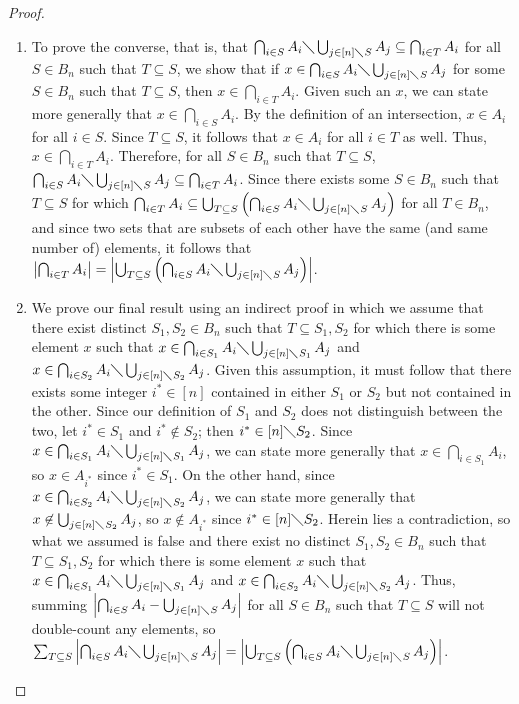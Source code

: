 \documentclass{article} %
\theoremstyle{definition}
\theoremstyle{plain}
\begin{document}
\begin{proof}
\begin{enumerate}
\item{To prove the converse, that is, that $\bigcap_{i\in S}A_i\diagdown\bigcup_{j\in [n]\diagdown S}A_j\subseteq \bigcap_{i\in T}A_i$ for all $S\in B_n$ such that $T\subseteq S$, we show that if $x\in \bigcap_{i\in S}A_i\diagdown\bigcup_{j\in [n]\diagdown S}A_j$ for some $S\in B_n$ such that $T\subseteq S$, then $x\in \bigcap_{i\in T}A_i$. Given such an $x$, we can state more generally that $x\in \bigcap_{i\in S}A_i$. By the definition of an intersection, $x\in A_i$ for all $i\in S$. Since $T\subseteq S$, it follows that $x\in A_i$ for all $i\in T$ as well. Thus, $x\in \bigcap_{i\in T}A_i$. Therefore, for all $S\in B_n$ such that $T\subseteq S$, $\bigcap_{i\in S}A_i\diagdown\bigcup_{j\in [n]\diagdown S}A_j\subseteq \bigcap_{i\in T}A_i$. Since there exists some $S\in B_n$ such that $T\subseteq S$ for which $\bigcap_{i\in T}A_i\subseteq \bigcup_{T\subseteq S}\left(\bigcap_{i\in S}A_i\diagdown\bigcup_{j\in [n]\diagdown S}A_j\right)$ for all $T\in B_n$, and since two sets that are subsets of each other have the same (and same number of) elements, it follows that $\left|\bigcap_{i\in T}A_i\right|=\left|\bigcup_{T\subseteq S}\left(\bigcap_{i\in S}A_i\diagdown\bigcup_{j\in [n]\diagdown S}A_j\right)\right|$.}
\item{We prove our final result using an indirect proof in which we assume that there exist distinct $S_1,S_2\in B_n$ such that $T\subseteq S_1, S_2$ for which there is some element $x$ such that $x\in\bigcap_{i\in S_1}A_i\diagdown\bigcup_{j\in [n]\diagdown S_1}A_j$ and $x\in\bigcap_{i\in S_2}A_i\diagdown\bigcup_{j\in [n]\diagdown S_2}A_j$. Given this assumption, it must follow that there exists some integer $i^*\in [n]$ contained in either $S_1$ or $S_2$ but not contained in the other. Since our definition of $S_1$ and $S_2$ does not distinguish between the two, let $i^*\in S_1$ and $i^*\not\in S_2$; then $i^*\in [n]\diagdown S_2$. Since $x\in\bigcap_{i\in S_1}A_i\diagdown\bigcup_{j\in [n]\diagdown S_1}A_j$, we can state more generally that $x\in\bigcap_{i\in S_1}A_i$, so $x\in A_{i^*}$ since $i^*\in S_1$. On the other hand, since $x\in\bigcap_{i\in S_2}A_i\diagdown\bigcup_{j\in [n]\diagdown S_2}A_j$, we can state more generally that $x\not\in \bigcup_{j\in [n]\diagdown S_2}A_j$, so $x\not\in A_{i^*}$ since $i^*\in [n]\diagdown S_2$. Herein lies a contradiction, so what we assumed is false and there exist no distinct $S_1,S_2\in B_n$ such that $T\subseteq S_1,S_2$ for which there is some element $x$ such that $x\in\bigcap_{i\in S_1}A_i\diagdown\bigcup_{j\in [n]\diagdown S_1}A_j$ and $x\in\bigcap_{i\in S_2}A_i\diagdown\bigcup_{j\in [n]\diagdown S_2}A_j$. Thus, summing $\left|\bigcap_{i\in S}A_i-\bigcup_{j\in [n]\diagdown S}A_j\right|$ for all $S\in B_n$ such that $T\subseteq S$ will not double-count any elements, so $\sum_{T\subseteq S}\left|\bigcap_{i\in S}A_i\diagdown\bigcup_{j\in [n]\diagdown S}A_j\right|=\left|\bigcup_{T\subseteq S}\left(\bigcap_{i\in S}A_i\diagdown\bigcup_{j\in [n]\diagdown S}A_j\right)\right|$.}

\end{enumerate}
\end{proof}
\end{document}
